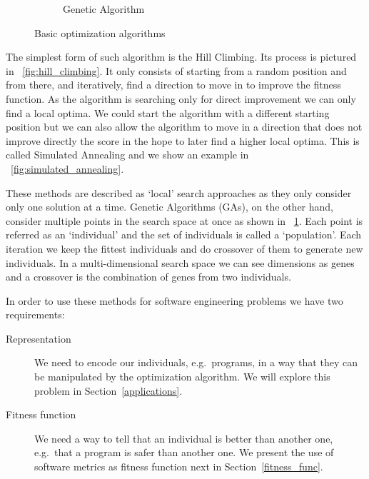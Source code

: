 \documentclass[11pt]{sdm}
\begin{document}
\begin{figure}
\begin{subfigure}[b]{0.33\textwidth}
\caption{Genetic Algorithm}
\label{fig:genetic_algo}
  \end{subfigure}
\caption{Basic optimization algorithms}
\label{fig:optimization_algos}
\end{figure}

The simplest form of such algorithm is the Hill Climbing.
Its process is pictured in \figurename~\ref{fig:hill_climbing}.
It only consists of starting from a random position and from there, and iteratively, find a direction to move in to improve the fitness function.
As the algorithm is searching only for direct improvement we can only find a local optima.
We could start the algorithm with a different starting position but we can also allow the algorithm to move in a direction that does not improve directly the score in the hope to later find a higher local optima.
This is called Simulated Annealing and we show an example in \figurename~\ref{fig:simulated_annealing}.

These methods are described as `local' search approaches as they only consider only one solution at a time.
Genetic Algorithms (GAs), on the other hand, consider multiple points in the search space at once as shown in \figurename~\ref{fig:genetic_algo}.
Each point is referred as an `individual' and the set of individuals is called a `population'.
Each iteration we keep the fittest individuals and do crossover of them to generate new individuals.
In a multi-dimensional search space we can see dimensions as genes and a crossover is the combination of genes from two individuals.

In order to use these methods for software engineering problems we have two requirements:
\begin{description}
  \item[Representation] We need to encode our individuals, e.g.\ programs, in a way that they can be manipulated by the optimization algorithm. We will explore this problem in Section~\ref{applications}.
  \item[Fitness function] We need a way to tell that an individual is better than another one, e.g.\ that a program is safer than another one. We present the use of software metrics as fitness function next in Section~\ref{fitness_func}.
\end{description}
\end{document}
